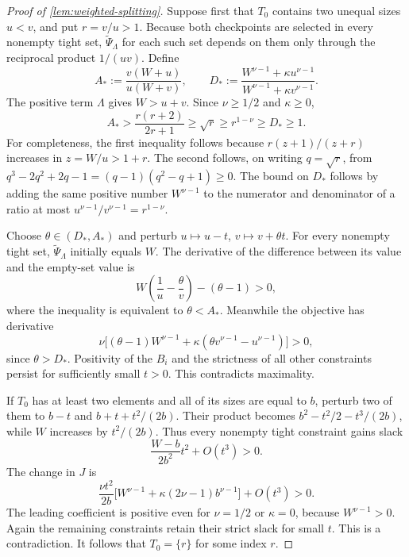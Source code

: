 \documentclass[10pt,a4paper]{amsart}
\begin{document}
\begin{proof}[Proof of \cref{lem:weighted-splitting}]
Suppose first that $T_0$ contains two unequal sizes $u<v$, and put $r=v/u>1$.
Because both checkpoints are selected in every nonempty tight set, $\widetilde\Psi_\Lambda$ for each such set depends on them only through the reciprocal product $1/(uv)$.
Define
\[
  A_*:=\frac{v(W+u)}{u(W+v)},\qquad
  D_*:=\frac{W^{\nu-1}+\kappa u^{\nu-1}}
             {W^{\nu-1}+\kappa v^{\nu-1}}.
\]
The positive term $\Lambda$ gives $W>u+v$.
Since $\nu\ge1/2$ and $\kappa\ge0$,
\begin{equation*}
  A_*>\frac{r(r+2)}{2r+1}\ge\sqrt r
  \ge r^{1-\nu}\ge D_*\ge1.
\end{equation*}
For completeness, the first inequality follows because $r(z+1)/(z+r)$ increases in $z=W/u>1+r$.
The second follows, on writing $q=\sqrt r$, from $q^3-2q^2+2q-1=(q-1)(q^2-q+1)\ge0$.
The bound on $D_*$ follows by adding the same positive number $W^{\nu-1}$ to the numerator and denominator of a ratio at most $u^{\nu-1}/v^{\nu-1}=r^{1-\nu}$.

Choose $\theta\in(D_*,A_*)$ and perturb $u\mapsto u-t$, $v\mapsto v+\theta t$.
For every nonempty tight set, $\widetilde\Psi_\Lambda$ initially equals $W$.
The derivative of the difference between its value and the empty-set value is
\[
  W\left(\frac1u-\frac\theta v\right)-(\theta-1)>0,
\]
where the inequality is equivalent to $\theta<A_*$.
Meanwhile the objective has derivative
\[
  \nu\bigl[(\theta-1)W^{\nu-1}
     +\kappa(\theta v^{\nu-1}-u^{\nu-1})\bigr]>0,
\]
since $\theta>D_*$.
Positivity of the $B_i$ and the strictness of all other constraints persist for sufficiently small $t>0$.
This contradicts maximality.

If $T_0$ has at least two elements and all of its sizes are equal to $b$, perturb two of them to $b-t$ and $b+t+t^2/(2b)$.
Their product becomes $b^2-t^2/2-t^3/(2b)$, while $W$ increases by $t^2/(2b)$.
Thus every nonempty tight constraint gains slack
\[
  \frac{W-b}{2b^2}t^2+O(t^3)>0.
\]
The change in $J$ is
\[
  \frac{\nu t^2}{2b}
  \bigl[W^{\nu-1}+\kappa(2\nu-1)b^{\nu-1}\bigr]+O(t^3)>0.
\]
The leading coefficient is positive even for $\nu=1/2$ or $\kappa=0$, because $W^{\nu-1}>0$.
Again the remaining constraints retain their strict slack for small $t$.
This is a contradiction.
It follows that $T_0=\{r\}$ for some index $r$.


\end{proof}
\end{document}
